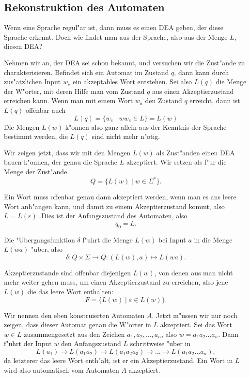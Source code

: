 \subsection{Rekonstruktion des Automaten\label{regulaer:rekonstruktion}}
Wenn eine Sprache regul"ar ist, dann muss es einen DEA geben, der
diese Sprache erkennt. Doch wie findet man aus der Sprache, also 
aus der Menge $L$, diesen DEA?

Nehmen wir an, der DEA sei schon bekannt, und versuchen wir
die Zust"ande zu charakterisieren. Befindet sich ein Automat
im Zustand $q$, dann kann durch zus"atzlichen Input $w_e$ ein
akzeptables Wort entstehen. Sei also
$L(q)$ die Menge der W"orter, mit deren Hilfe man vom Zustand $q$
aus einen Akzeptierzustand erreichen kann. Wenn man mit einem Wort
$w_a$ den Zustand $q$ erreicht, dann ist $L(q)$ offenbar auch
\[
L(q)=\{ w_e\;|\; ww_e \in L\}= L(w)
\]
Die Mengen $L(w)$ k"onnen also ganz allein aus der Kenntnis der
Sprache bestimmt werden, die $L(q)$ sind nicht mehr n"otig.

Wir zeigen jetzt, dass wir mit den Mengen $L(w)$ als Zust"anden einen
DEA bauen k"onnen, der genau die Sprache $L$ akzeptiert.
Wir setzen als f"ur die Menge der Zust"ande 
\[
Q=\{L(w)\;|\;w\in\Sigma^*\}.
\]

Ein Wort muss offenbar genau dann akzeptiert werden, wenn
man es ans leere Wort anh"angen kann, und damit zu einem Akzeptierzustand
kommt, also $L=L(\varepsilon)$. Dies ist der Anfangszustand des Automaten,
also
\[
q_0=L.
\]

Die "Ubergangsfunktion $\delta$ f"uhrt die Menge $L(w)$ bei Input
$a$ in die Menge $L(wa)$ "uber, also
\[
\delta \colon Q\times\Sigma\to Q:(L(w),a)\mapsto L(wa).
\]

Akzeptierzustande sind offenbar diejenigen $L(w)$, von denen
aus man nicht mehr weiter gehen muss, um einen Akzeptierzustand
zu erreichen, also jene $L(w)$ die das leere Wort enthalten:
\[
F=\{L(w)\;|\;\varepsilon\in L(w)\}.
\]

Wir nennen den eben konstruierten Automaten $A$.
Jetzt m"ussen wir nur noch zeigen, dass dieser Automat genau die
W"orter in $L$ akzeptiert.
Sei das Wort $w\in L$ zusammengesetzt aus den
Zeichen $a_1,a_2,\dots,a_n$, also $w=a_1a_2\dots a_n$. Dann f"uhrt
der Input $w$ den Anfangszustand $L$ schrittweise "uber in
\[
L(a_1)\to L(a_1a_2)\to L(a_1a_2a_3)\to \dots \to L(a_1a_2\dots a_n),
\]
da letzterer das leere Wort enth"alt, ist er ein Akzeptierzustand.
Ein Wort in $L$ wird also automatisch vom Automaten $A$ akzeptiert.

